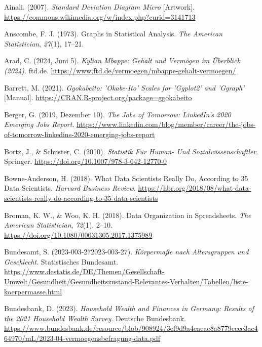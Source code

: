 \documentclass[
  letterpaper,
  oneside,
  open=any]{scrbook}
\newlength{\cslhangindent}
\newenvironment{CSLReferences}[2] %
 {\begin{list}{}{%
  \setlength{\itemindent}{0pt}
  \setlength{\leftmargin}{0pt}
  \setlength{\parsep}{0pt}
  \ifodd #1
   \setlength{\leftmargin}{\cslhangindent}
   \setlength{\itemindent}{-1\cslhangindent}
  \fi
  \setlength{\itemsep}{#2\baselineskip}}}
 {\end{list}}
\theoremstyle{definition}
\theoremstyle{definition}
\theoremstyle{definition}
\theoremstyle{remark}
\begin{document}
\label{refs}
\begin{CSLReferences}{1}{0}
Ainali. (2007). \emph{Standard Deviation Diagram Micro} {[}Artwork{]}.
\url{https://commons.wikimedia.org/w/index.php?curid=3141713}

Anscombe, F. J. (1973). Graphs in Statistical Analysis. \emph{The
American Statistician}, \emph{27}(1), 17--21.

Arad, C. (2024, Juni 5). \emph{Kylian Mbappe: Gehalt und Vermögen im
Überblick (2024)}. ftd.de.
\url{https://www.ftd.de/vermoegen/mbappe-gehalt-vermoegen/}

Barrett, M. (2021). \emph{Ggokabeito: '{Okabe-Ito}' {Scales} for
'Ggplot2' and 'Ggraph'} {[}Manual{]}.
\url{https://CRAN.R-project.org/package=ggokabeito}

Berger, G. (2019, Dezember 10). \emph{The {Jobs} of {Tomorrow}:
{LinkedIn}'s 2020 {Emerging Jobs Report}}.
\url{https://www.linkedin.com/blog/member/career/the-jobs-of-tomorrow-linkedins-2020-emerging-jobs-report}

Bortz, J., \& Schuster, C. (2010). \emph{Statistik Für {Human-} Und
{Sozialwissenschaftler}}. Springer.
\url{https://doi.org/10.1007/978-3-642-12770-0}

Bowne-Anderson, H. (2018). What {Data Scientists Really Do}, {According}
to 35 {Data Scientists}. \emph{Harvard Business Review}.
\url{https://hbr.org/2018/08/what-data-scientists-really-do-according-to-35-data-scientists}

Broman, K. W., \& Woo, K. H. (2018). Data {Organization} in
{Spreadsheets}. \emph{The American Statistician}, \emph{72}(1), 2--10.
\url{https://doi.org/10.1080/00031305.2017.1375989}

Bundesamt, S. (2023-003-272023-003-27). \emph{Körpermaße nach
Altersgruppen und Geschlecht}. Statistisches Bundesamt.
\url{https://www.destatis.de/DE/Themen/Gesellschaft-Umwelt/Gesundheit/Gesundheitszustand-Relevantes-Verhalten/Tabellen/liste-koerpermasse.html}

Bundesbank, D. (2023). \emph{Household Wealth and Finances in {Germany}:
{Results} of the 2021 Household Wealth Survey}. Deutsche Bundesbank.
\url{https://www.bundesbank.de/resource/blob/908924/3ef9d9a4eaeae8a8779ccec3ac464970/mL/2023-04-vermoegensbefragung-data.pdf}


\end{CSLReferences}
\end{document}
